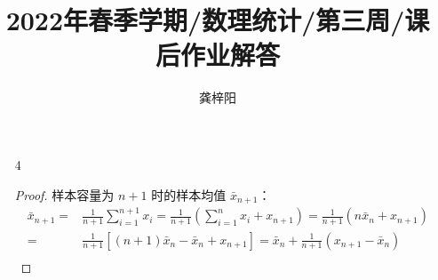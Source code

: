 \documentclass[normal,cn]{elegantnote}
\title{2022年春季学期/数理统计/第三周/课后作业解答}
\author{龚梓阳}
\date{\zhtoday}
\begin{document}
\begin{enumerate}
    \item[4]
        \begin{proof}
            样本容量为 $n+1$ 时的样本均值 $\bar{x}_{n+1}$：
            \begin{equation*}
                \begin{aligned}
                    \bar{x}_{n+1}= & \frac{1}{n+1}\sum_{i=1}^{n+1}x_i=\frac{1}{n+1}\left(\sum_{i=1}^nx_i+x_{n+1}\right)=\frac{1}{n+1}\left(n\bar{x}_n+x_{n+1}\right) \\
                    =              & \frac{1}{n+1}[\left(n+1\right)\bar{x}_n-\bar{x}_n+x_{n+1}]=\bar{x}_n+\frac{1}{n+1}\left(x_{n+1}-\bar{x}_n\right)                \\
                \end{aligned}
            \end{equation*}


\end{proof}
\end{enumerate}
\end{document}
